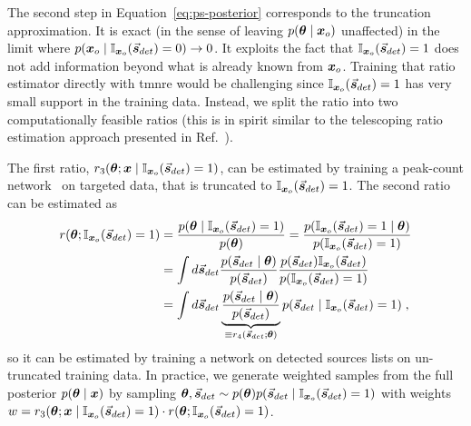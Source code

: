 The second step in Equation~\eqref{eq:ps-posterior} corresponds to the truncation approximation. It is exact (in the sense of leaving $p(\bm{\theta}\mid \bm{x}_o)$ unaffected) in the limit where $p(\bm{x}_o\mid \mathbb{I}_{\bm{x}_o}(\vec{\boldsymbol{s}}_{det})=0) \to 0$. It exploits the fact that $\mathbb{I}_{\bm{x}_o}(\vec{\boldsymbol{s}}_{det}) = 1$ does not add information beyond what is already known from $\bm{x}_o$.  
Training that ratio estimator directly with \gls*{tmnre} would be challenging since $\mathbb{I}_{\bm{x}_o}(\vec{\boldsymbol{s}}_{det})=1$ has very small support in the training data.  Instead, we split the ratio into two computationally feasible ratios (this is in spirit similar to the telescoping ratio estimation approach presented in Ref.~\cite{Rhodes:2020aa}).

The first ratio, $ r_3(\bm{\theta}; \bm{x}\mid \mathbb{I}_{\bm{x}_o}(\vec{\boldsymbol{s}}_{det})=1)$, can be estimated by training a peak-count network~\citep{Cholakkal:2019aa, Ranjan:2021aa, Kilic:2021aa} on targeted data, that is truncated to $\mathbb{I}_{\bm{x}_o}(\vec{\boldsymbol{s}}_{det})=1$. The second ratio can be estimated as
\begin{equation}\label{eq:ps-average}
\begin{split}
    r(\bm{\theta}; \mathbb{I}_{\bm{x}_o}(\vec{\boldsymbol{s}}_{det})=1)
    &= \frac{p(\bm{\theta}\mid \mathbb{I}_{\bm{x}_o}(\vec{\boldsymbol{s}}_{det})=1)}{p(\bm{\theta})}
    = \frac{p(\mathbb{I}_{\bm{x}_o}(\vec{\boldsymbol{s}}_{det})=1\mid \bm{\theta})}{p(\mathbb{I}_{\bm{x}_o}(\vec{\boldsymbol{s}}_{det})=1)}\\
    &= \int d\vec{\boldsymbol{s}}_{det} \frac{p(\vec{\boldsymbol{s}}_{det}\mid \bm{\theta})} {p(\vec{\boldsymbol{s}}_{det})}
    \frac{p(\vec{\boldsymbol{s}}_{det})\mathbb{I}_{\bm{x}_o}(\vec{\boldsymbol{s}}_{det})}{p(\mathbb{I}_{\bm{x}_o}(\vec{\boldsymbol{s}}_{det})=1)} \\
    &= \int d\vec{\boldsymbol{s}}_{det} 
    \underbrace{\frac{p(\vec{\boldsymbol{s}}_{det}\mid \bm{\theta})} {p(\vec{\boldsymbol{s}}_{det})}}_{
    \equiv {r_4(\vec{\boldsymbol{s}}_{det};\ensuremath{\bm{\theta}})}}
    p(\vec{\boldsymbol{s}}_{det}\mid \mathbb{I}_{\bm{x}_o}(\vec{\boldsymbol{s}}_{det})= 1) \; ,
\end{split}
\end{equation}
so it can be estimated by training a network on detected sources lists on un-truncated training data.
In practice, we generate weighted samples from the full posterior $p(\bm{\theta}\mid \bm{x})$ by sampling $\bm{\theta}, \vec{\boldsymbol{s}}_{det} \sim p(\bm{\theta})p(\vec{\boldsymbol{s}}_{det}\mid \mathbb{I}_{\bm{x}_o}(\vec{\boldsymbol{s}}_{det})=1)$
with weights
$w = { r_3(\bm{\theta}; \bm{x}\mid \mathbb{I}_{\bm{x}_o}(\vec{\boldsymbol{s}}_{det})=1)}\cdot
r(\bm{\theta}; \mathbb{I}_{\bm{x}_o}(\vec{\boldsymbol{s}}_{det})=1)
$.  

